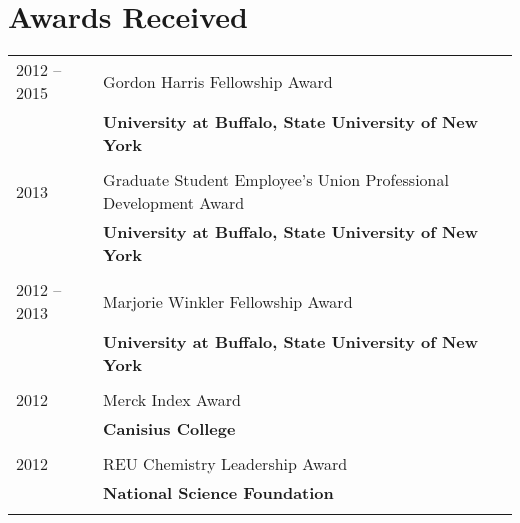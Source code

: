 \documentclass[letterpaper,10pt]{article} %
\begin{document}
\section{Awards Received}
\noindent 
\begin{tabular}{R{3cm}|p{13cm}} 

2012 -- 2015 & Gordon Harris Fellowship Award \\
& \textbf{University at Buffalo, State University of New York} \\
 \\


2013 & Graduate Student Employee’s Union Professional Development Award \\
& \textbf{University at Buffalo, State University of New York} \\
 \\


2012 -- 2013 & Marjorie Winkler Fellowship Award \\
& \textbf{University at Buffalo, State University of New York} \\
 \\


2012  & Merck Index Award \\
& \textbf{Canisius College} \\
 \\


2012  & REU Chemistry Leadership Award \\
& \textbf{National Science Foundation} \\
 \\

\end{tabular}



\end{document}
